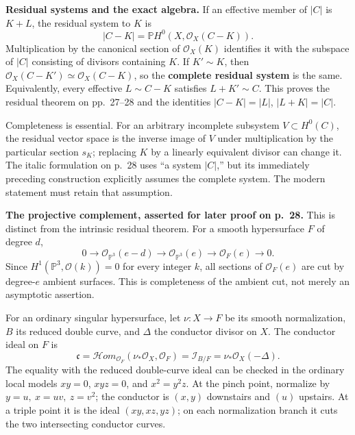 \textbf{Residual systems and the exact algebra.} If an effective member of \(|C|\) is \(K+L\), the residual system to \(K\) is \[
|C-K|=\mathbb P H^0(X,\mathcal O_X(C-K)).
\] Multiplication by the canonical section of \(\mathcal O_X(K)\) identifies it with the subspace of \(|C|\) consisting of divisors containing \(K\). If \(K'\sim K\), then \(\mathcal O_X(C-K')\simeq\mathcal O_X(C-K)\), so the \textbf{complete residual system} is the same. Equivalently, every effective \(L\sim C-K\) satisfies \(L+K'\sim C\). This proves the residual theorem on pp.~27--28 and the identities \(|C-K|=|L|\), \(|L+K|=|C|\).

Completeness is essential. For an arbitrary incomplete subsystem \(V\subset H^0(C)\), the residual vector space is the inverse image of \(V\) under multiplication by the particular section \(s_K\); replacing \(K\) by a linearly equivalent divisor can change it. The italic formulation on p.~28 uses ``a system \(|C|\),'' but its immediately preceding construction explicitly assumes the complete system. The modern statement must retain that assumption.

\textbf{The projective complement, asserted for later proof on p.~28.} This is distinct from the intrinsic residual theorem. For a smooth hypersurface \(F\) of degree \(d\), \[
0\longrightarrow\mathcal O_{\mathbb P^3}(e-d)
\longrightarrow\mathcal O_{\mathbb P^3}(e)
\longrightarrow\mathcal O_F(e)\longrightarrow0.
\] Since \(H^1(\mathbb P^3,\mathcal O(k))=0\) for every integer \(k\), all sections of \(\mathcal O_F(e)\) are cut by degree-\(e\) ambient surfaces. This is completeness of the ambient cut, not merely an asymptotic assertion.

For an ordinary singular hypersurface, let \(\nu:X\to F\) be its smooth normalization, \(B\) its reduced double curve, and \(\Delta\) the conductor divisor on \(X\). The conductor ideal on \(F\) is \[
\mathfrak c=
\mathcal{H}om_{\mathcal O_F}(\nu_*\mathcal O_X,\mathcal O_F)
=\mathcal I_{B/F}=\nu_*\mathcal O_X(-\Delta).
\] The equality with the reduced double-curve ideal can be checked in the ordinary local models \(xy=0\), \(xyz=0\), and \(x^2=y^2z\). At the pinch point, normalize by \(y=u,\ x=uv,\ z=v^2\); the conductor is \((x,y)\) downstairs and \((u)\) upstairs. At a triple point it is the ideal \((xy,xz,yz)\); on each normalization branch it cuts the two intersecting conductor curves.

